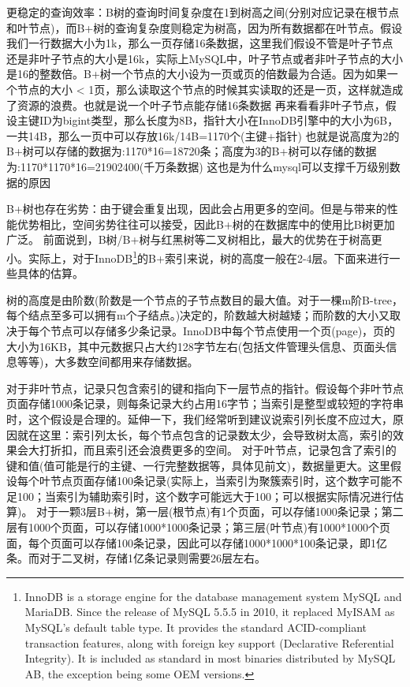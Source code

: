 \documentclass[../../../interview-questions.tex]{subfiles}
\begin{document}
更稳定的查询效率：B树的查询时间复杂度在1到树高之间(分别对应记录在根节点和叶节点)，而B+树的查询复杂度则稳定为树高，因为所有数据都在叶节点。假设我们一行数据大小为1k，那么一页存储16条数据，这里我们假设不管是叶子节点还是非叶子节点的大小是16k，实际上MySQL中，叶子节点或者非叶子节点的大小是16的整数倍。B+树一个节点的大小设为一页或页的倍数最为合适。因为如果一个节点的大小 < 1页，那么读取这个节点的时候其实读取的还是一页，这样就造成了资源的浪费。也就是说一个叶子节点能存储16条数据
再来看看非叶子节点，假设主键ID为bigint类型，那么长度为8B，指针大小在InnoDB引擎中的大小为6B，一共14B，那么一页中可以存放16k/14B=1170个(主键+指针)
也就是说高度为2的B+树可以存储的数据为:1170*16=18720条；高度为3的B+树可以存储的数据为:1170*1170*16=21902400(千万条数据)
这也是为什么mysql可以支撑千万级别数据的原因

B+树也存在劣势：由于键会重复出现，因此会占用更多的空间。但是与带来的性能优势相比，空间劣势往往可以接受，因此B+树的在数据库中的使用比B树更加广泛。
前面说到，B树/B+树与红黑树等二叉树相比，最大的优势在于树高更小。实际上，对于InnoDB\footnote{InnoDB is a storage engine for the database management system MySQL and MariaDB. Since the release of MySQL 5.5.5 in 2010, it replaced MyISAM as MySQL's default table type. It provides the standard ACID-compliant transaction features, along with foreign key support (Declarative Referential Integrity). It is included as standard in most binaries distributed by MySQL AB, the exception being some OEM versions.}的B+索引来说，树的高度一般在2-4层。下面来进行一些具体的估算。

树的高度是由阶数(阶数是一个节点的子节点数目的最大值。对于一棵m阶B-tree，每个结点至多可以拥有m个子结点。)决定的，阶数越大树越矮；而阶数的大小又取决于每个节点可以存储多少条记录。InnoDB中每个节点使用一个页(page)，页的大小为16KB，其中元数据只占大约128字节左右(包括文件管理头信息、页面头信息等等)，大多数空间都用来存储数据。

对于非叶节点，记录只包含索引的键和指向下一层节点的指针。假设每个非叶节点页面存储1000条记录，则每条记录大约占用16字节；当索引是整型或较短的字符串时，这个假设是合理的。延伸一下，我们经常听到建议说索引列长度不应过大，原因就在这里：索引列太长，每个节点包含的记录数太少，会导致树太高，索引的效果会大打折扣，而且索引还会浪费更多的空间。
对于叶节点，记录包含了索引的键和值(值可能是行的主键、一行完整数据等，具体见前文)，数据量更大。这里假设每个叶节点页面存储100条记录(实际上，当索引为聚簇索引时，这个数字可能不足100；当索引为辅助索引时，这个数字可能远大于100；可以根据实际情况进行估算)。
对于一颗3层B+树，第一层(根节点)有1个页面，可以存储1000条记录；第二层有1000个页面，可以存储1000*1000条记录；第三层(叶节点)有1000*1000个页面，每个页面可以存储100条记录，因此可以存储1000*1000*100条记录，即1亿条。而对于二叉树，存储1亿条记录则需要26层左右。
\end{document}
